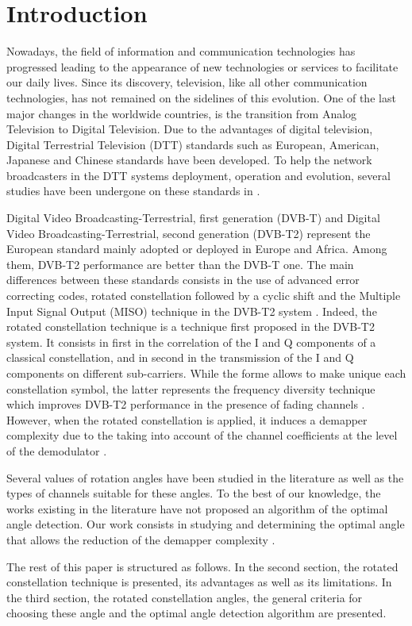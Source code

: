 \enlargethispage{1\baselineskip}
\section{Introduction}
\label{sec:intro}
Nowadays, the field of information and communication technologies has progressed leading to the appearance of new technologies or services to facilitate our daily lives. Since its discovery, television, like all other communication technologies, has not remained on the sidelines of this evolution. One of the last major changes in the worldwide countries, is the transition from Analog Television to Digital Television. Due to the advantages of digital television, Digital Terrestrial Television (DTT) standards such as European, American, Japanese and Chinese standards have been developed. To help the network broadcasters in the DTT systems deployment, operation and evolution, several studies have been undergone on these standards in \cite{ref1}.

Digital Video Broadcasting-Terrestrial, first generation (DVB-T) and Digital Video Broadcasting-Terrestrial, second generation (DVB-T2) represent the European standard mainly adopted or deployed in Europe and Africa. Among them, DVB-T2 performance are better than the DVB-T one. The main differences between these standards consists in the use of advanced error correcting codes, rotated constellation followed by a cyclic shift and the Multiple Input Signal Output (MISO) technique in the DVB-T2 system \cite{ref2}. Indeed, the rotated constellation technique is a technique first proposed in the DVB-T2 system. It consists in first in the correlation of the I and Q components of a classical constellation, and in second in the transmission of the I and Q components on different sub-carriers. While the forme allows to make unique each constellation symbol, the latter represents the frequency diversity technique which improves DVB-T2 performance in the presence of fading channels \cite{ref3}. However, when the rotated constellation is applied, it induces a demapper complexity due to the taking into account of the channel coefficients at the level of the demodulator \cite{ref4}.

Several values of rotation angles have been studied in the literature as well as the types of channels suitable for these angles. To the best of our knowledge, the works existing in the literature have not proposed an algorithm of the optimal angle detection. Our work consists in studying and determining the optimal angle that allows the reduction of the demapper complexity \cite{ref5}.

The rest of this paper is structured as follows. In the second section, the rotated constellation technique is presented, its advantages as well as its limitations. In the third section, the rotated constellation angles, the general criteria for choosing these angle and the optimal angle detection algorithm are presented.
